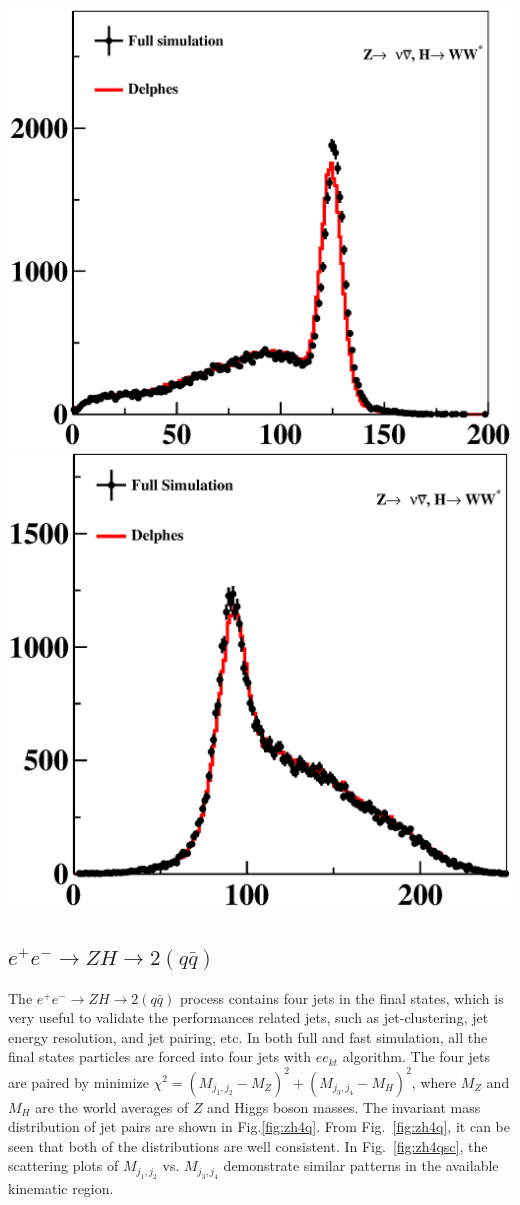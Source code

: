 \documentclass[a4paper,10pt,twoside]{cpc-hepnp}
\begin{document}
\begin{multicols}{2}
\begin{center}
\includegraphics[width=0.4\linewidth]{figs/nnh_mass}
\includegraphics[width=0.4\linewidth]{figs/nnh_reco}
\end{center}

\subsection{$e^+e^- \to ZH \to 2(q\bar{q})$}

The $e^+e^- \to ZH \to 2(q\bar{q})$ process contains four jets in the final states, which is very useful
to validate the performances related jets, such as jet-clustering, jet energy resolution, and jet pairing, etc.
In both full and fast simulation, all the final states particles are forced into four jets with $ee_{kt}$ algorithm.
The four jets are paired by minimize $\chi^2 = (M_{j_1,j_2} - M_Z)^2 + (M_{j_3,j_4}-M_H)^2$,
where $M_Z$ and $M_H$ are the world averages of $Z$ and Higgs boson masses. 
The invariant mass distribution of jet pairs are shown in Fig.\ref{fig:zh4q}.
From Fig.~\ref{fig:zh4q}, it can be seen that both of the distributions are well consistent.
In Fig.~\ref{fig:zh4qsc}, the scattering plots of $M_{j_1,j_2}$  vs. $M_{j_3,j_4}$ 
demonstrate similar patterns in the available kinematic region.


\end{multicols}
\end{document}
